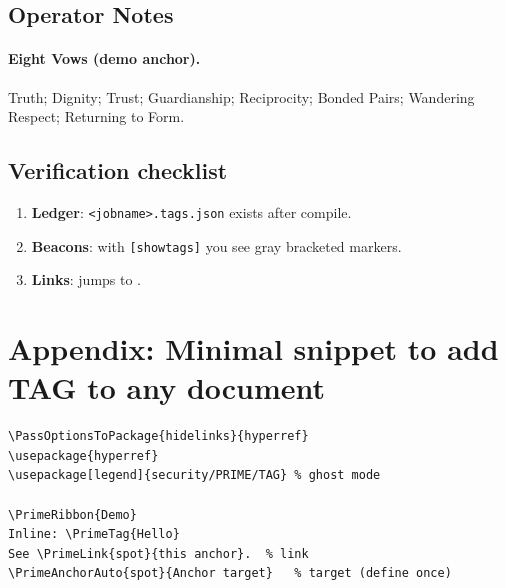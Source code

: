 \documentclass[11pt]{article}
\begin{document}
\subsection*{Operator Notes}

\newpage
{}
\paragraph{Eight Vows (demo anchor).}
Truth; Dignity; Trust; Guardianship; Reciprocity; Bonded Pairs; Wandering Respect; Returning to Form.

\subsection*{Verification checklist}
\begin{enumerate}
  \item \textbf{Ledger}: \texttt{<jobname>.tags.json} exists after compile.
  \item \textbf{Beacons}: with \verb|[showtags]| you see gray bracketed markers.
  \item \textbf{Links}:  jumps to .
\end{enumerate}

\section*{Appendix: Minimal snippet to add TAG to any document}
\begin{lstlisting}
\PassOptionsToPackage{hidelinks}{hyperref}
\usepackage{hyperref}
\usepackage[legend]{security/PRIME/TAG} % ghost mode

\PrimeRibbon{Demo}
Inline: \PrimeTag{Hello}
See \PrimeLink{spot}{this anchor}.  % link
\PrimeAnchorAuto{spot}{Anchor target}   % target (define once)
\end{lstlisting}




\end{document}
